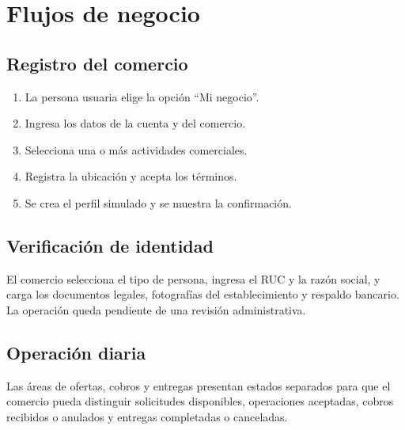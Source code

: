 \section{Flujos de negocio}

\subsection{Registro del comercio}

\begin{enumerate}
  \item La persona usuaria elige la opción ``Mi negocio''.
  \item Ingresa los datos de la cuenta y del comercio.
  \item Selecciona una o más actividades comerciales.
  \item Registra la ubicación y acepta los términos.
  \item Se crea el perfil simulado y se muestra la confirmación.
\end{enumerate}

\subsection{Verificación de identidad}

El comercio selecciona el tipo de persona, ingresa el RUC y la razón social, y carga los documentos legales, fotografías del establecimiento y respaldo bancario. La operación queda pendiente de una revisión administrativa.

\subsection{Operación diaria}

Las áreas de ofertas, cobros y entregas presentan estados separados para que el comercio pueda distinguir solicitudes disponibles, operaciones aceptadas, cobros recibidos o anulados y entregas completadas o canceladas.
